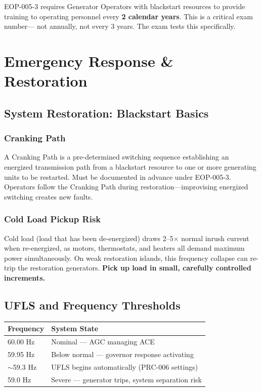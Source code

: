 \documentclass[12pt,twoside,openright]{memoir}
\begin{document}
\begin{examtip}
EOP-005-3 requires Generator Operators with blackstart resources to provide training
to operating personnel every \textbf{2 calendar years}. This is a critical exam number—
not annually, not every 3 years. The exam tests this specifically.
\end{examtip}

\chapter{Emergency Response \& Restoration}
\label{ch:emergencyresponse}

\section{System Restoration: Blackstart Basics}

\subsection{Cranking Path}
A Cranking Path is a pre-determined switching sequence establishing an energized
transmission path from a blackstart resource to one or more generating units to be
restarted. Must be documented in advance under EOP-005-3. Operators follow the
Cranking Path during restoration—improvising energized switching creates new faults.

\subsection{Cold Load Pickup Risk}
Cold load (load that has been de-energized) draws 2--5$\times$ normal inrush current
when re-energized, as motors, thermostats, and heaters all demand maximum power
simultaneously. On weak restoration islands, this frequency collapse can re-trip the
restoration generators. \textbf{Pick up load in small, carefully controlled increments.}

\section{UFLS and Frequency Thresholds}

\begin{center}
\begin{tabular}{@{}ll@{}}
\toprule
\rowcolor{nercblue!15}
\textbf{Frequency} & \textbf{System State} \\
\midrule
60.00 Hz & Nominal — AGC managing ACE \\
\rowcolor{rowlight}
59.95 Hz & Below normal — governor response activating \\
$\sim$59.3 Hz & UFLS begins automatically (PRC-006 settings) \\
\rowcolor{rowlight}
59.0 Hz & Severe — generator trips, system separation risk \\
\bottomrule
\end{tabular}
\end{center}
\end{document}
